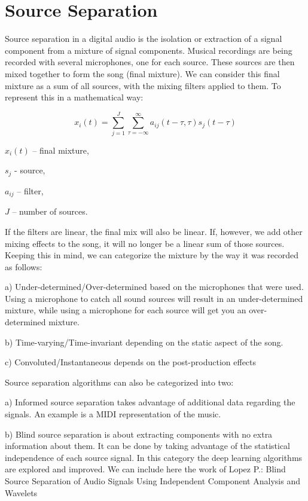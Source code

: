 \documentclass[../Thesis.tex]{subfiles}
\begin{document}
 
\section {Source Separation}
Source separation in a digital audio is the isolation or extraction of a signal component from a mixture of signal components. Musical recordings are being recorded with several microphones, one for each source. These sources are then mixed together to form the song (final mixture). We can consider this final mixture as a sum of all sources, with the mixing filters applied to them. To represent this in a mathematical way:

\[ \mathit{x}_\mathit{i} (\mathit{t})
= \sum_{\mathit{j} = 1}^{\mathit{J}} \sum_{\tau = - \infty}^{\infty} \mathit{a}_{\mathit{ij}} (\mathit{t} - \tau, \tau) \mathit{s}_{\mathit{j}} ( \mathit{t} - \tau ) \]
 
$\mathit{x}_\mathit{i} (t)$ – final mixture,

$\mathit{s}_\mathit{j}$ - source, 

$\mathit{a}_\mathit{ij}$ – filter, 

$\mathit{J}$ – number of sources.


If the filters are linear, the final mix will also be linear. If, however, we add other mixing effects to the song, it will no longer be a linear sum of those sources. Keeping this in mind, we can categorize the mixture by the way it was recorded as follows:

a)	Under-determined/Over-determined based on the microphones that were used. Using a microphone to catch all sound sources will result in an under-determined mixture, while using a microphone for each source will get you an over-determined mixture.

b)	Time-varying/Time-invariant depending on the static aspect of the song.

c)	Convoluted/Instantaneous depends on the post-production effects

Source separation algorithms can also be categorized into two:

a)	Informed source separation takes advantage of additional data regarding the signals. An example is a MIDI representation of the music.

b)	Blind source separation is about extracting components with no extra information about them. It can be done by taking advantage of the statistical independence of each source signal. In this category the deep learning algorithms are explored and improved. We can include here the work of Lopez P.: Blind Source Separation of Audio Signals Using Independent Component Analysis and Wavelets
\end{document}
